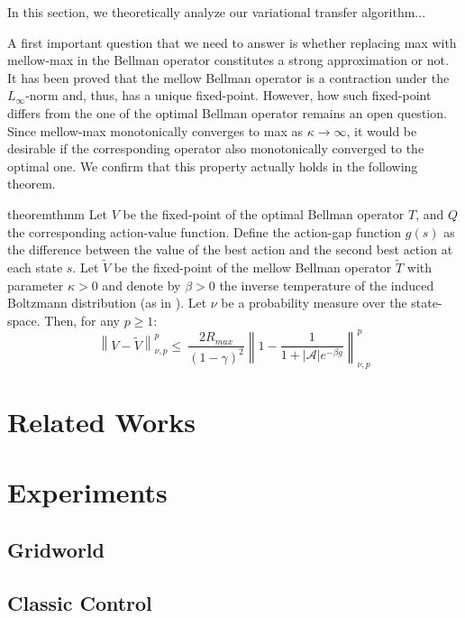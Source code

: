 \documentclass{article}
\newcommand{\wt}[1]{\widetilde{#1}}
\newcommand{\norm}[1]{\left\lVert #1 \right\rVert}
\newcommand{\abs}[1]{\left\lvert #1 \right\rvert}
\begin{document}
In this section, we theoretically analyze our variational transfer algorithm...

A first important question that we need to answer is whether replacing max with mellow-max in the Bellman operator constitutes a strong approximation or not. It has been proved \cite{}  that the mellow Bellman operator is a contraction under the $L_{\infty}$-norm and, thus, has a unique fixed-point.  However, how such fixed-point differs from the one of the optimal Bellman operator remains an open question. Since mellow-max monotonically converges to max as $\kappa \rightarrow \infty$, it would be desirable if the corresponding operator also monotonically converged to the optimal one. We confirm that this property actually holds in the following theorem.

\begin{restatable}{theorem}{thmm} \label{th:mm}
Let $V$ be the fixed-point of the optimal Bellman operator $T$, and $Q$ the corresponding action-value function. Define the action-gap function $g(s)$ as the difference between the value of the best action and the second best action at each state $s$. Let $\wt{V}$ be the fixed-point of the mellow Bellman operator $\wt{T}$ with parameter $\kappa > 0$ and denote by $\beta > 0$ the inverse temperature of the induced Boltzmann distribution (as in \cite{}). Let $\nu$ be a probability measure over the state-space. Then, for any $p \geq 1$:
\begin{equation}
\norm{V-\wt{V}}_{\nu,p}^p \leq\ \frac{2R_{max}}{(1-\gamma)^2}\norm{1 - \frac{1}{1 + \abs{\mathcal{A}}e^{-\beta g}}}_{\nu,p}^p
\end{equation}
\end{restatable}

\section{Related Works}

\section{Experiments}

\subsection{Gridworld}

\subsection{Classic Control}
\end{document}
